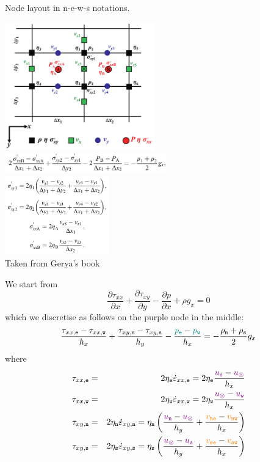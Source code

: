 \begin{multicols}{2}


{\captionfont Node layout in {n-e-w-s} notations.}

\columnbreak

\includegraphics[width=6.5cm]{images/fdm/gerya_B}\\
\includegraphics[width=7cm]{images/fdm/gerya_D}\\
\includegraphics[width=4.5cm]{images/fdm/gerya_F}\\
{\captionfont Taken from Gerya's book}
\end{multicols}

We start from 
\[
\frac{\partial \tau_{xx}}{\partial x}  + 
\frac{\partial \tau_{xy}}{\partial y}  
- \frac{\partial p}{\partial x} + \rho g_x = 0
\]
which we discretise as follows on the purple node in the middle:
\[
\frac{\tau_{xx,{\tt e}}-\tau_{xx,{\tt w}}}{h_x} + \frac{\tau_{xy,{\tt n}}-\tau_{xy,{\tt s}}}{h_y} 
-\frac{{\color{teal}p_{\tt e}}-{\color{teal}p_{\tt w}}}{h_x} 
= -\frac{\rho_{\tt n}+\rho_{\tt s}}{2} g_x
\]
where
\begin{eqnarray}
\tau_{xx,{\tt e}} 
&=& 2 \eta_{\tt e} \dot{\varepsilon}_{xx,{\tt e}} 
= 2\eta_{\tt e} \frac{{\color{violet} u_{\tt e}}-{\color{violet} u_\otimes}}{h_x} \nonumber \\
\tau_{xx,{\tt w}} 
&=& 2 \eta_{\tt w} \dot{\varepsilon}_{xx,{\tt w}} 
= 2\eta_{\tt w} \frac{{\color{violet} u_\otimes}-{\color{violet} u_{\tt w}}}{h_x} \nonumber\\
\tau_{xy,{\tt n}} &=& 2 \eta_{\tt n} \dot{\varepsilon}_{xy,{\tt n}} 
= \eta_{\tt n} \left( \frac{{\color{violet} u_{\tt n}}-{\color{violet} u_\otimes}}{h_y} 
+\frac{{\color{orange} v_{\tt ne}}-{\color{orange} v_{\tt nw}}}{h_x} \right) \nonumber\\
\tau_{xy,{\tt s}} &=& 2 \eta_{\tt s} \dot{\varepsilon}_{xy,{\tt s}} 
= \eta_{\tt s} \left( \frac{{\color{violet} u_\otimes}-{\color{violet} u_{\tt s}}}{h_y} 
+\frac{{\color{orange}v_{\tt se}}-{\color{orange} v_{\tt sw}}}{h_x} \right)  \nonumber
\end{eqnarray}


